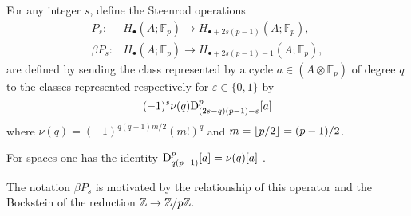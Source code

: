 \sssec

For any integer $s$, define the Steenrod operations
\begin{align*}
	P_s \colon& H_\bullet(A; \mathbb{F}_p) \to H_{\bullet + 2s(p-1)}(A; \mathbb{F}_p), \\
	\beta P_s \colon& H_\bullet(A; \mathbb{F}_p) \to H_{\bullet + 2s(p-1) - 1}(A; \mathbb{F}_p),
\end{align*}
are defined by sending the class represented by a cycle $a \in (A \otimes \mathbb{F}_p)$ of degree $q$ to the classes represented respectively for $\varepsilon \in\{0,1\}$ by
\begin{equation*}
	(-1)^s \nu(q) \mathrm{D}^p_{(2s-q)(p-1)-\varepsilon}[a]
\end{equation*}
where $\nu(q) = (-1)^{q(q-1)m/2}(m!)^q$ and $m = \lfloor p/2\rfloor = (p-1)/2$.


\begin{remark*}
	For spaces one has the identity $\mathrm{D}_{q(p-1)}^p[a] = \nu(q)[a]$ \cite[(6.1)]{steenrod1953cyclic}.
\end{remark*}

\begin{remark*}
	The notation $\beta P_s$ is motivated by the relationship of this operator and the Bockstein of the reduction $\mathbb{Z} \to \mathbb{Z}/p\mathbb{Z}$.
\end{remark*}